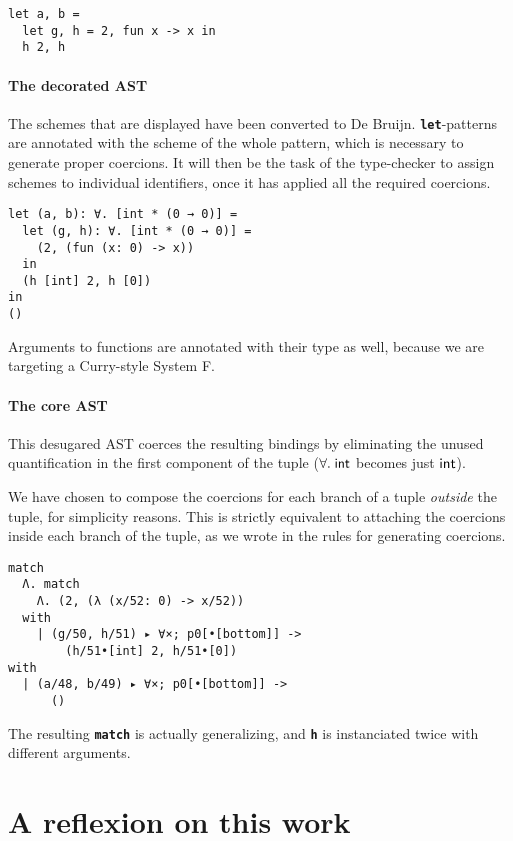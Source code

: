 \documentclass[10pt,a4paper,twoside,titlepage,twocolumn]{article}
\newcommand{\code}[1]{\textbf{\texttt{#1}}}
\begin{document}
\begin{verbatim}
let a, b =
  let g, h = 2, fun x -> x in
  h 2, h
\end{verbatim}

\subsection{The decorated AST}

The schemes that are displayed have been converted to De Bruijn.
\code{let}-patterns are annotated with the scheme of the whole pattern, which is
necessary to generate proper coercions. It will then be the task of the
type-checker to assign schemes to individual identifiers, once it has applied
all the required coercions.

\begin{verbatim}
let (a, b): ∀. [int * (0 → 0)] =
  let (g, h): ∀. [int * (0 → 0)] =
    (2, (fun (x: 0) -> x))
  in
  (h [int] 2, h [0])
in
()
\end{verbatim}

Arguments to functions are annotated with their type as well, because we are
targeting a Curry-style System F.

\subsection{The core AST}

This desugared AST coerces the resulting bindings by eliminating the unused
quantification in the first component of the tuple ($\forall.\;\text{\textsf{int}}$ becomes
just $\text{\textsf{int}}$).

We have chosen to compose the coercions for each branch of a tuple
\emph{outside} the tuple, for simplicity reasons. This is strictly equivalent to
attaching the coercions inside each branch of the tuple, as we wrote in the
rules for generating coercions.

\begin{verbatim}
match
  Λ. match
    Λ. (2, (λ (x/52: 0) -> x/52))
  with
    | (g/50, h/51) ▸ ∀×; p0[•[bottom]] ->
        (h/51•[int] 2, h/51•[0])
with
  | (a/48, b/49) ▸ ∀×; p0[•[bottom]] ->
      ()
\end{verbatim}

The resulting \code{match} is actually generalizing, and \code{h} is
instanciated twice with different arguments.

\part{A reflexion on this work}
\end{document}
